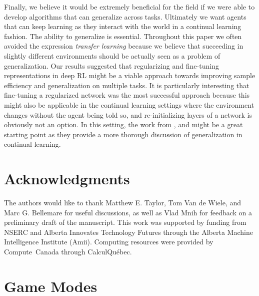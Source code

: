 \documentclass{article}
\begin{document}
Finally, we believe it would be extremely beneficial for the field if we were able to develop algorithms that can generalize across tasks. Ultimately we want agents that can keep learning as they interact with the world in a continual learning fashion. The ability to generalize is essential. Throughout this paper we often avoided the expression \emph{transfer learning} because we believe that succeeding in slightly different environments should be actually seen as a problem of generalization. Our results suggested that regularizing and fine-tuning representations in deep RL might be a viable approach towards improving sample efficiency and generalization on multiple tasks. It is particularly interesting that fine-tuning a regularized network was the most successful approach because this might also be applicable in the continual learning settings where the environment changes without the agent being told so, and re-initializing layers of a network is obviously not an option.
In this setting, the work from \cite{Kirkpatrick16}, and \cite{Schwarz18} might be a great starting point as they provide a more thorough discussion of generalization in continual learning.

\section*{Acknowledgments}

The authors would like to thank Matthew E. Taylor, Tom Van de Wiele, and  Marc G. Bellemare for useful discussions, as well as Vlad Mnih for feedback on a preliminary draft of the manuscript.
This work was supported by funding from NSERC and Alberta Innovates Technology Futures through the
Alberta Machine Intelligence Institute (Amii). Computing resources were provided by Compute~Canada through CalculQu\'{e}bec.




\newpage
\appendix

\section{Game Modes}
\label{appendix:modes}
\end{document}
